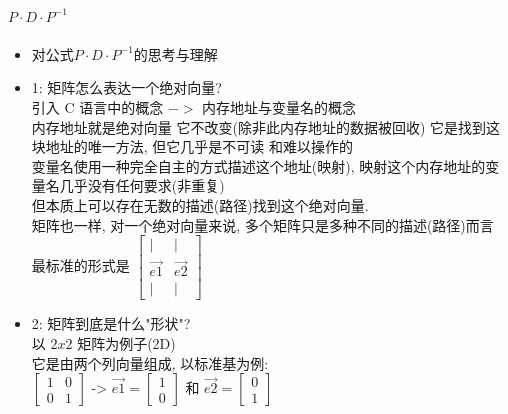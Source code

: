 \documentclass[12pt]{article}
\begin{document}
\paragraph{$P\cdot D \cdot P^{-1}$}
\begin{flushleft}
    \begin{itemize}
        \item 对公式$P\cdot D \cdot P^{-1}$的思考与理解
        \item 1: 矩阵怎么表达一个绝对向量? \\
              引入 C 语言中的概念 $->$ 内存地址与变量名的概念 \\
              内存地址就是绝对向量 它不改变(除非此内存地址的数据被回收) 它是找到这块地址的唯一方法, 但它几乎是不可读
              和难以操作的 \\
              变量名使用一种完全自主的方式描述这个地址(映射), 映射这个内存地址的变量名几乎没有任何要求(非重复) \\
              但本质上可以存在无数的描述(路径)找到这个绝对向量.\\
              矩阵也一样, 对一个绝对向量来说, 多个矩阵只是多种不同的描述(路径)而言\\
              最标准的形式是 $\begin{bmatrix}
                      \vert    & \vert    \\
                      \vec{e1} & \vec{e2} \\
                      \vert    & \vert
                  \end{bmatrix}$ \\
        \item 2: 矩阵到底是什么"形状"? \\
              以 $2 x 2$ 矩阵为例子(2D) \\
              它是由两个列向量组成, 以标准基为例: \\
              $\begin{bmatrix}
                      1 & 0 \\
                      0 & 1
                  \end{bmatrix}$ -> $\vec{e1} = \begin{bmatrix}
                      1 \\
                      0
                  \end{bmatrix}$ 和 $\vec{e2} = \begin{bmatrix}
                      0 \\
                      1
                  \end{bmatrix}$ \\

\end{itemize}
\end{flushleft}
\end{document}
